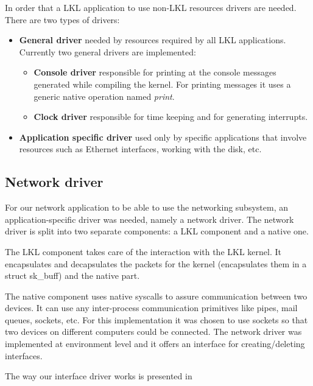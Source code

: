 In order that a LKL application to use non-LKL resources drivers are needed. There are two types of drivers:
\begin{itemize}
\item \textbf{General driver} needed by resources required by all LKL applications. Currently two general drivers are implemented:
\begin{itemize}
\item \textbf{Console driver} responsible for printing at the console messages generated while compiling the kernel. For printing messages it uses a generic native operation named \textit{print}.
\item \textbf{Clock driver} responsible for time keeping and for generating interrupts.
\end{itemize}
\item \textbf{Application specific driver} used only by specific applications that involve resources such as Ethernet interfaces, working with the disk, etc.
\end{itemize}

\subsection{Network driver}
\label{sec:net-driver}
For our network application to be able to use the networking subsystem, an application-specific driver was needed, namely a network driver. 
The network driver is split into two separate components: a LKL component and a native one.

The LKL component takes care of the interaction with the LKL kernel. It encapsulates
and decapsulates the packets for the kernel (encapsulates them in a struct sk_buff)
and the native part.

The native component uses native syscalls to assure communication between two devices.
It can use any inter-process communication primitives like pipes, mail queues, sockets, etc.
For this implementation it was chosen to use sockets so that two devices on different computers could be connected.
The network driver was implemented at environment level and it offers an interface for creating/deleting interfaces.

The way our interface driver works is presented in 

